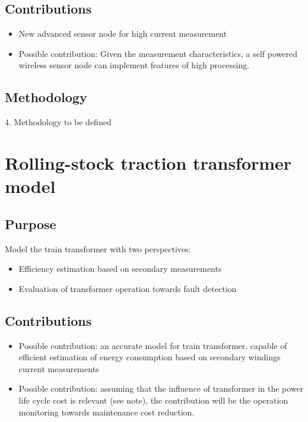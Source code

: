 \subsection{Contributions}

\begin{itemize}
	\setlength\itemsep{0em}
	\item New advanced sensor node for high current measurement

	\item Possible contribution: Given the measurement characteristics, a self powered wireless sensor node can implement features of high processing.
\end{itemize}
\subsection{Methodology}

4.	Methodology to be defined





\newpage
\section{Rolling-stock traction transformer model}

\subsection{Purpose}
Model the train transformer with two perspectives:

\begin{itemize}
	\setlength\itemsep{0em}
	\item Efficiency estimation based on secondary measurements
	
	\item Evaluation of transformer operation towards fault detection
\end{itemize}


\subsection{Contributions}

\begin{itemize}
	\setlength\itemsep{0em}
	\item 	Possible contribution: an accurate model for train transformer, capable of efficient estimation of energy consumption based on secondary windings current measurements
	
	\item 	Possible contribution: assuming that the influence of transformer in the power life cycle cost is relevant (see note), the contribution will be the operation monitoring towards maintenance cost reduction.
\end{itemize}


